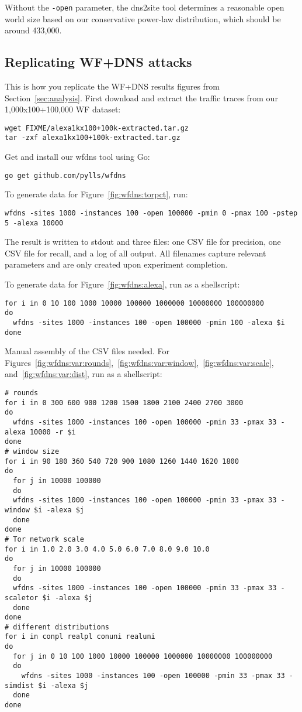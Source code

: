 Without the \texttt{-open} parameter, the dns2site tool determines a reasonable
open world size based on our conservative power-law distribution,
which should be around 433,000.

\subsection{Replicating WF+DNS attacks}
This is how you replicate the WF+DNS results figures from
Section~\ref{sec:analysis}.
First download and extract the traffic traces from our
1,000x100+100,000 WF dataset:

\begin{lstlisting}
wget FIXME/alexa1kx100+100k-extracted.tar.gz
tar -zxf alexa1kx100+100k-extracted.tar.gz
\end{lstlisting}

Get and install our wfdns tool using Go:

\begin{lstlisting}
go get github.com/pylls/wfdns
\end{lstlisting}

To generate data for Figure~\ref{fig:wfdns:torpct}, run:

\begin{lstlisting}
wfdns -sites 1000 -instances 100 -open 100000 -pmin 0 -pmax 100 -pstep 5 -alexa 10000
\end{lstlisting}

The result is written to stdout and three files: one CSV file for precision,
one CSV file for recall, and a log of all output. All filenames capture relevant
parameters and are only created upon experiment completion.

To generate data for Figure~\ref{fig:wfdns:alexa}, run as a shellscript:

\begin{lstlisting}
for i in 0 10 100 1000 10000 100000 1000000 10000000 100000000
do
  wfdns -sites 1000 -instances 100 -open 100000 -pmin 100 -alexa $i
done
\end{lstlisting}

Manual assembly of the CSV files needed. For
Figures~\ref{fig:wfdns:var:rounds},~\ref{fig:wfdns:var:window},~\ref{fig:wfdns:var:scale},
and~\ref{fig:wfdns:var:dist}, run
as a shellscript:

\begin{lstlisting}
# rounds
for i in 0 300 600 900 1200 1500 1800 2100 2400 2700 3000
do
  wfdns -sites 1000 -instances 100 -open 100000 -pmin 33 -pmax 33 -alexa 10000 -r $i
done
# window size
for i in 90 180 360 540 720 900 1080 1260 1440 1620 1800
do
  for j in 10000 100000
  do
  wfdns -sites 1000 -instances 100 -open 100000 -pmin 33 -pmax 33 -window $i -alexa $j
  done
done
# Tor network scale
for i in 1.0 2.0 3.0 4.0 5.0 6.0 7.0 8.0 9.0 10.0
do
  for j in 10000 100000
  do
  wfdns -sites 1000 -instances 100 -open 100000 -pmin 33 -pmax 33 -scaletor $i -alexa $j
  done
done
# different distributions
for i in conpl realpl conuni realuni
do
  for j in 0 10 100 1000 10000 100000 1000000 10000000 100000000
  do
    wfdns -sites 1000 -instances 100 -open 100000 -pmin 33 -pmax 33 -simdist $i -alexa $j
  done
done
\end{lstlisting}

